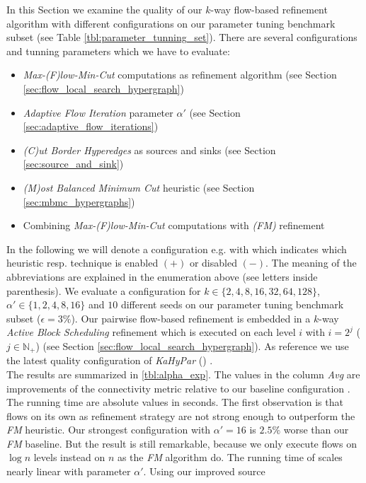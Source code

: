 In this Section we examine the quality of our $k$-way flow-based refinement algorithm with
different configurations on our parameter tuning benchmark subset (see Table \ref{tbl:parameter_tunning_set}).
There are several configurations and tunning parameters which we have to evaluate:
\begin{itemize}
\item \emph{Max-(F)low-Min-Cut} computations as refinement algorithm (see Section \ref{sec:flow_local_search_hypergraph})
\item \emph{Adaptive Flow Iteration} parameter $\alpha'$ (see Section \ref{sec:adaptive_flow_iterations})
\item \emph{(C)ut Border Hyperedges} as sources and sinks (see Section \ref{sec:source_and_sink})
\item \emph{(M)ost Balanced Minimum Cut} heuristic (see Section \ref{sec:mbmc_hypergraphs})
\item Combining \emph{Max-(F)low-Min-Cut} computations with \emph{(FM)} refinement
\end{itemize}
In the following we will denote a configuration e.g. with \FlowVariant{+}{-}{-}{-} which indicates
which heuristic resp. technique is enabled $(+)$ or disabled $(-)$. The meaning of the 
abbreviations are explained in the enumeration above (see letters inside parenthesis). We evaluate
a configuration for $k \in \{2,4,8,16,32,64,128\}$, $\alpha' \in \{1,2,4,8,16\}$
and $10$ different seeds on our parameter tuning benchmark subset ($\epsilon = 3\%$). 
Our pairwise flow-based refinement is embedded in a $k$-way \emph{Active Block Scheduling}
refinement which is executed on each level $i$ with $i = 2^j$ ($j \in \mathbb{N}_+$) 
(see Section \ref{sec:flow_local_search_hypergraph}). As reference we use the 
latest quality configuration of \emph{KaHyPar} () \cite{heuer2017improving}. \\
The results are summarized in \autoref{tbl:alpha_exp}. The values
in the column \emph{Avg} are improvements of the connectivity metric
relative to our baseline configuration \FlowVariant{-}{-}{-}{+}. The running
time are absolute values in seconds. The first observation is that flows on
its own as refinement strategy are not strong enough to outperform the
\emph{FM} heuristic. Our strongest configuration with $\alpha' = 16$
is $2.5\%$ worse than our \emph{FM} baseline. But the result 
is still remarkable, because we only execute flows on $\log{n}$ levels
instead on $n$ as the \emph{FM} algorithm do. The running time of
scales nearly linear with parameter $\alpha'$. Using our improved source 
